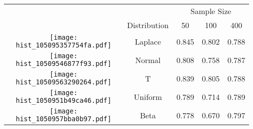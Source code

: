 
\begin{tabular}[t]{>{}ccccc}
\toprule
\multicolumn{2}{c}{  } & \multicolumn{3}{c}{Sample Size} \\
\cmidrule(l{3pt}r{3pt}){3-5}
  & Distribution & 50 & 100 & 400\\
\midrule
\texttt{[image: hist\_105095357754fa.pdf]} & Laplace & 0.845 & 0.802 & 0.788\\
\texttt{[image: hist\_10509546877f93.pdf]} & Normal & 0.808 & 0.758 & 0.787\\
\texttt{[image: hist\_10509563290264.pdf]} & T & 0.839 & 0.805 & 0.788\\
\texttt{[image: hist\_1050951b49ca46.pdf]} & Uniform & 0.789 & 0.714 & 0.789\\
\texttt{[image: hist\_1050957bba0b97.pdf]} & Beta & 0.778 & 0.670 & 0.797\\
\bottomrule
\end{tabular}
